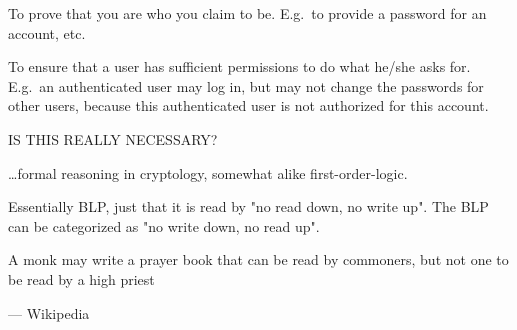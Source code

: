 \begin{definition}
\end{definition}

\begin{definition}[Authentication]
	To prove that you are who you claim to be. E.g.\ to provide a password
	for an account, etc.
\end{definition}

\begin{definition}[Authorization]

	To ensure that a user has sufficient permissions to do what he/she
	asks for. E.g.\ an authenticated user may log in, but may not
	change the passwords for other users, because this authenticated user
	is not authorized for this account.
\end{definition}

\begin{definition}
	IS THIS REALLY NECESSARY?

	\dots formal reasoning in cryptology, somewhat alike first-order-logic.
\end{definition}

\begin{definition}\label{biba}
	Essentially BLP, just that it is read by "no read down, no write up".
	The BLP can be categorized as "no write down, no read up".

	\epigraph{A monk may write a prayer book that can be read by commoners, 
	but not one to be read by a high priest}
	{--- \textup{Wikipedia}}

\end{definition}


